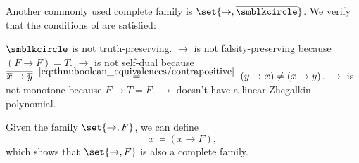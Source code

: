\begin{example}
\begin{thmenum}
     Another commonly used complete family is \( \set{ \rightarrow, \overline{\anon} } \).
    We verify that the conditions of  are satisfied:
    \begin{refenum}
       \( \overline{\anon} \) is not truth-preserving.
       \( \rightarrow \) is not falsity-preserving because \( (F \rightarrow F) = T \).
       \( \rightarrow \) is not self-dual because \( \overline{\overline{x} \rightarrow \overline{y}} \reloset {\eqref{eq:thm:boolean_equivalences/contrapositive}} = (y \rightarrow x) \neq (x \rightarrow y) \).
       \( \rightarrow \) is not monotone because \( F \rightarrow T = F \).
       \( \rightarrow \) doesn't have a linear Zhegalkin polynomial.
    \end{refenum}

     Given the family \( \set{ \rightarrow, F } \), we can define
    \begin{equation*}
      \overline{x} \coloneqq (x \rightarrow F),
    \end{equation*}
    which shows that \( \set{ \rightarrow, F } \) is also a complete family.
  \end{thmenum}
\end{example}
